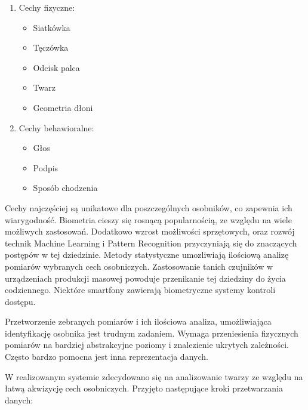 \documentclass[oneside, eng]{mgr}
\begin{document}
\begin{enumerate}

\item Cechy fizyczne:
	\begin{itemize}
		\item Siatkówka
		\item Tęczówka
		\item Odcisk palca
		\item Twarz
		\item Geometria dłoni
	\end{itemize}

\item Cechy behawioralne:
	\begin{itemize}
		\item Głos
		\item Podpis
		\item Sposób chodzenia
	\end{itemize}

\end{enumerate} 

Cechy najczęściej są unikatowe dla poszczególnych osobników, co zapewnia ich wiarygodność. Biometria cieszy się rosnącą popularnością, ze względu na wiele możliwych zastosowań. Dodatkowo wzrost możliwości sprzętowych, oraz rozwój technik Machine Learning i Pattern Recognition przyczyniają się do znaczących postępów w tej dziedzinie. Metody statystyczne umozliwiają ilościową analizę pomiarów wybranych cech osobniczych. Zastosowanie tanich czujników w urządzeniach produkcji masowej powoduje przenikanie tej dziedziny do życia codziennego. Niektóre smartfony zawierają biometryczne systemy kontroli dostępu. 

Przetworzenie zebranych pomiarów i ich ilościowa analiza, umożliwiająca identyfikację osobnika jest trudnym zadaniem. Wymaga przeniesienia fizycznych pomiarów na bardziej abstrakcyjne poziomy i znalezienie ukrytych zależności. Często bardzo pomocna jest inna reprezentacja danych. 

W realizowanym systemie zdecydowano się na analizowanie twarzy ze względu na łatwą akwizycję cech osobniczych. Przyjęto następujące kroki przetwarzania danych:
\end{document}
